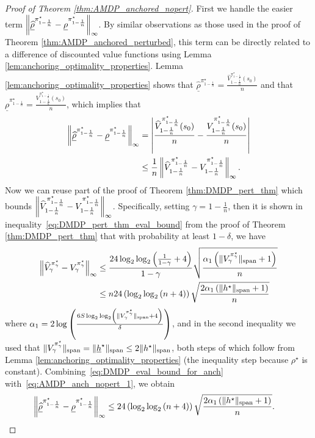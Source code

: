 \documentclass{article}
\theoremstyle{plain}
\theoremstyle{plain}
\theoremstyle{remark}
\theoremstyle{plain}
\theoremstyle{plain}
\newcommand{\Vhat}{\widehat{V}}
\newcommand{\pistar}{\pi^\star}
\newcommand{\rhohat}{\widehat{\rho}}
\newcommand{\rhohatanc}{ \underline{\rhohat}}
\newcommand{\rhoanc}{\underline{\rho}}
\newcommand{\hanc}{\underline{h}}
\begin{document}
\begin{proof}[Proof of Theorem \ref{thm:AMDP_anchored_nopert}]
    First we handle the easier term $\infnorm{\rhohatanc^{\pistar_{1 - \frac{1}{n}}} - \rhoanc^{\pistar_{1-\frac{1}{n}}}}$. By similar observations as those used in the proof of Theorem \ref{thm:AMDP_anchored_perturbed}, this term can be directly related to a difference of discounted value functions using Lemma \ref{lem:anchoring_optimality_properties}. Lemma \ref{lem:anchoring_optimality_properties} shows that $\rhohatanc^{\pistar_{1-\frac{1}{n}}} = \frac{\Vhat_{1-\frac{1}{n}}^{\pistar_{1-\frac{1}{n}}}(s_0)}{n}$ and that $\rhoanc^{\pistar_{1-\frac{1}{n}}} = \frac{V_{1-\frac{1}{n}}^{\pistar_{1-\frac{1}{n}}}(s_0)}{n}$, which implies that
    \begin{align}
        \infnorm{\rhohatanc^{\pistar_{1-\frac{1}{n}}} - \rhoanc^{\pistar_{1-\frac{1}{n}}}} &= \left|\frac{\Vhat_{1-\frac{1}{n}}^{\pistar_{1-\frac{1}{n}}}(s_0)}{n} - \frac{V_{1-\frac{1}{n}}^{\pistar_{1-\frac{1}{n}}}(s_0)}{n} \right| \nonumber\\
        & \leq \frac{1}{n} \infnorm{\Vhat_{1-\frac{1}{n}}^{\pistar_{1-\frac{1}{n}}} - V_{1-\frac{1}{n}}^{\pistar_{1-\frac{1}{n}}}}. \label{eq:AMDP_anch_nopert_1}
    \end{align}
    Now we can reuse part of the proof of Theorem \ref{thm:DMDP_pert_thm} which bounds $\infnorm{\Vhat_{1-\frac{1}{n}}^{\pistar_{1-\frac{1}{n}}} - V_{1-\frac{1}{n}}^{\pistar_{1-\frac{1}{n}}}}$. Specifically, setting $\gamma = 1- \frac{1}{n}$, then it is shown in inequality~\eqref{eq:DMDP_pert_thm_eval_bound} from the proof of Theorem \ref{thm:DMDP_pert_thm} that with probability at least $1 - \delta$, we have
    \begin{align}
         \infnorm{ \Vhat_{\gamma}^{\pistar_\gamma} - V_{\gamma}^{\pistar_\gamma}} & \leq \frac{24 \log_2 \log_2 \left( \frac{1}{1-\gamma} + 4\right)  }{1-\gamma}\sqrt{\frac{ \alpha_1 \left( \spannorm{V_\gamma^{\pistar_\gamma}} + 1\right)}{n}} \nonumber \\
         &\leq n 24 \left(\log_2 \log_2 \left( n + 4\right)\right) \sqrt{\frac{ 2\alpha_1 \left( \spannorm{h^\star} + 1\right)}{n}} \label{eq:DMDP_eval_bound_for_anch}
    \end{align}
    where $\alpha_1 = 2 \log \left( \frac{6 S \log_2 \log_2 \left(\spannorm{V_\gamma^{\pistar_\gamma}}+4 \right)}{\delta} \right) $, and in the second inequality we used that $\spannorm{V_\gamma^{\pistar_\gamma}} = \spannorm{\hanc^{\star}} \leq 2 \spannorm{h^\star}$, both steps of which follow from Lemma \ref{lem:anchoring_optimality_properties} (the inequality step because $\rho^\star$ is constant).
    Combining~\eqref{eq:DMDP_eval_bound_for_anch} with~\eqref{eq:AMDP_anch_nopert_1}, we obtain
    \begin{align}
        \infnorm{\rhohatanc^{\pistar_{1-\frac{1}{n}}} - \rhoanc^{\pistar_{1-\frac{1}{n}}}} & \leq 24\left( \log_2 \log_2 \left( n + 4\right) \right) \sqrt{\frac{ 2\alpha_1 \left( \spannorm{h^\star} + 1\right)}{n}} .\label{eq:AMDP_anch_nopert_2}
    \end{align}


\end{proof}
\end{document}
